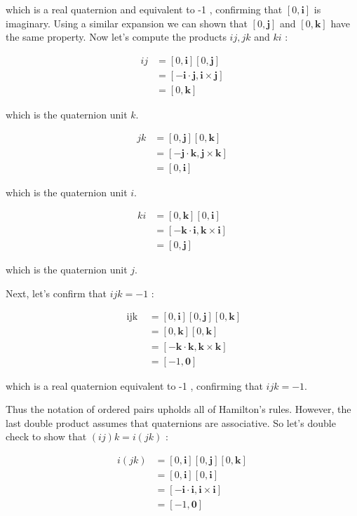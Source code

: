 \documentclass[10pt]{article}
\begin{document}
which is a real quaternion and equivalent to -1 , confirming that $[0, \mathbf{i}]$ is imaginary. Using a similar expansion we can shown that $[0, \mathbf{j}]$ and $[0, \mathbf{k}]$ have the same property. Now let's compute the products $i j, j k$ and $k i$ :

$$
\begin{aligned}
i j & =[0, \mathbf{i}][0, \mathbf{j}] \\
& =[-\mathbf{i} \cdot \mathbf{j}, \mathbf{i} \times \mathbf{j}] \\
& =[0, \mathbf{k}]
\end{aligned}
$$

which is the quaternion unit $k$.

$$
\begin{aligned}
j k & =[0, \mathbf{j}][0, \mathbf{k}] \\
& =[-\mathbf{j} \cdot \mathbf{k}, \mathbf{j} \times \mathbf{k}] \\
& =[0, \mathbf{i}]
\end{aligned}
$$

which is the quaternion unit $i$.

$$
\begin{aligned}
k i & =[0, \mathbf{k}][0, \mathbf{i}] \\
& =[-\mathbf{k} \cdot \mathbf{i}, \mathbf{k} \times \mathbf{i}] \\
& =[0, \mathbf{j}]
\end{aligned}
$$

which is the quaternion unit $j$.

Next, let's confirm that $i j k=-1$ :

$$
\begin{aligned}
\text { ijk } & =[0, \mathbf{i}][0, \mathbf{j}][0, \mathbf{k}] \\
& =[0, \mathbf{k}][0, \mathbf{k}] \\
& =[-\mathbf{k} \cdot \mathbf{k}, \mathbf{k} \times \mathbf{k}] \\
& =[-1, \mathbf{0}]
\end{aligned}
$$

which is a real quaternion equivalent to -1 , confirming that $i j k=-1$.

Thus the notation of ordered pairs upholds all of Hamilton's rules. However, the last double product assumes that quaternions are associative. So let's double check to show that $(i j) k=i(j k)$ :

$$
\begin{aligned}
i(j k) & =[0, \mathbf{i}][0, \mathbf{j}][0, \mathbf{k}] \\
& =[0, \mathbf{i}][0, \mathbf{i}] \\
& =[-\mathbf{i} \cdot \mathbf{i}, \mathbf{i} \times \mathbf{i}] \\
& =[-1, \mathbf{0}]
\end{aligned}
$$
\end{document}

